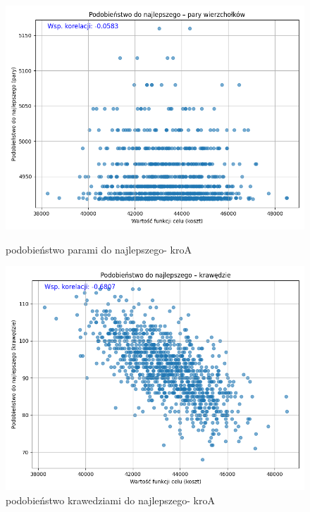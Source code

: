 \documentclass[11pt]{article}
\begin{document}
\begin{figure}[H]
    \begin{minipage}[t]{0.45\textwidth}
        \centering
        \includegraphics[width=\linewidth]{wypuklosci/podobienstwo-naj-parami-kroA}
        \caption{podobieństwo parami do najlepszego- kroA}
    \end{minipage}
    \hfill
    \begin{minipage}[t]{0.45\textwidth}
        \centering
        \includegraphics[width=\linewidth]{wypuklosci/podobienstwo-naj-krawedziami-kroA}
        \caption{podobieństwo krawedziami do najlepszego- kroA}
    \end{minipage}\label{fig:figure12}
\end{figure}
\end{document}
